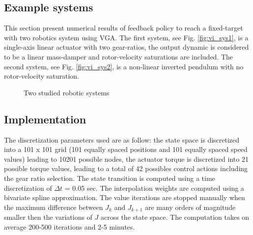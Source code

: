 \subsection{Example systems}

This section present numerical results of feedback policy to reach a fixed-target with two robotics system using VGA. The first system, see Fig. \ref{fig:vi_sys1}, is a single-axis linear actuator with two gear-ratios, the output dynamic is considered to be a linear mass-damper and rotor-velocity saturations are included. The second system, see Fig. \ref{fig:vi_sys2}, is a non-linear inverted pendulum with no rotor-velocity saturation. 
%
\begin{figure}[htp]
        \centering
				\hspace{+5pt}
       \caption{Two studied robotic systems}
			\label{fig:studiedsys}
\end{figure}
%

\subsection{Implementation}
\label{sec:Methodology}

The discretization parameters used are as follow: the state space is discretized into a 101 x 101 grid (101 equally spaced positions and 101 equally spaced speed values) leading to 10201 possible nodes, the actuator torque is discretized into 21 possible torque values, leading to a total of 42 possibles control actions including the gear ratio selection. The state transition is computed using a time discretization of $\Delta t$ = 0.05 sec. The interpolation weights are computed using a bivariate spline approximation. The value iterations are stopped manually when the maximum difference between $J_k$ and $J_{k+1}$ are many orders of magnitude smaller then the variations of $J$ across the state space. The computation takes on average 200-500 iterations and 2-5 minutes.

